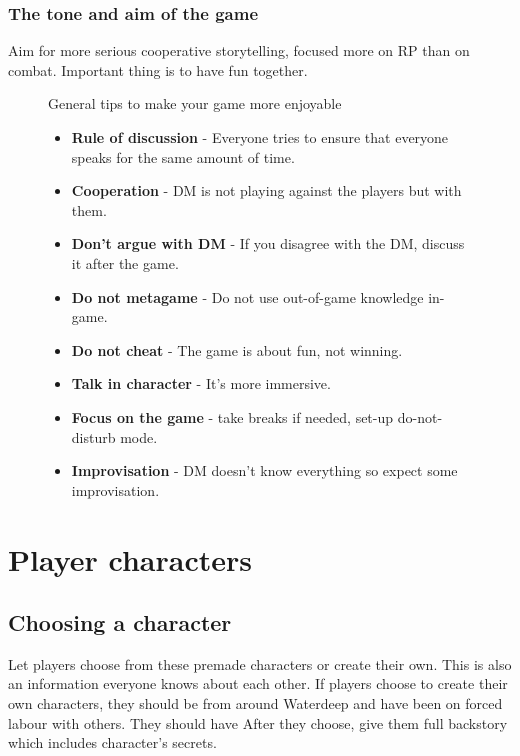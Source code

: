 \documentclass[10pt,onecolumn,twoside,openany,bg=full,layout=true]{dndbook}
\begin{document}
\subsection*{The tone and aim of the game}
Aim for more serious cooperative storytelling, focused more on RP than on combat.
Important thing is to have fun together.

\begin{figure}
  \begin{DndComment}{General tips to make your game more enjoyable}
    \begin{itemize}
      \item \textbf{Rule of discussion} - Everyone tries to ensure that everyone speaks for the same amount of time.
      \item \textbf{Cooperation} - DM is not playing against the players but with them.
      \item \textbf{Don't argue with DM} - If you disagree with the DM, discuss it after the game.
      \item \textbf{Do not metagame} - Do not use out-of-game knowledge in-game.
      \item \textbf{Do not cheat} - The game is about fun, not winning.
      \item \textbf{Talk in character} - It's more immersive.
      \item \textbf{Focus on the game} - take breaks if needed, set-up do-not-disturb mode.
      \item \textbf{Improvisation} - DM doesn't know everything so expect some improvisation.
    \end{itemize}
  \end{DndComment}
\end{figure}
\vfill
\pagebreak

\onecolumn
\chapter{Player characters}\label{ch:player-characters}
\section{Choosing a character}\label{sec:choosing-a-character}
Let players choose from these premade characters or create their own.
This is also an information everyone knows about each other.
If players choose to create their own characters, they should be from around Waterdeep and have been on forced labour with others.
They should have
After they choose, give them full backstory which includes character's secrets.
\end{document}
